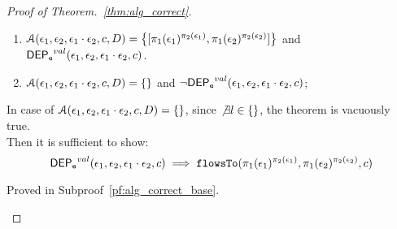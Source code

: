 \documentclass[a4paper,11pt]{article}
\begin{document}
\begin{proof}[Proof of Theorem.~\ref{thm:alg_correct}]
\begin{case}
\begin{enumerate}
  \item $\mathcal{A}(\event_1, \event_2, \event_1 \cdot \event_2, c, D) = 
  \left\{[\pi_1(\event_1)^{\pi_2(\event_1)}, \pi_1(\event_2)^{\pi_2(\event_2)}] \right \}$ 
  and $\mathsf{DEP_{\mathtt{e}}}^{val}(\mathtt{\epsilon}_1, \mathtt{\epsilon}_2, \mathtt{\epsilon}_1 \cdot \mathtt{\epsilon}_2, c)$.
  \item  $\mathcal{A}(\mathtt{\epsilon}_1, \mathtt{\epsilon}_2, \mathtt{\epsilon}_1 \cdot \mathtt{\epsilon}_2, c, D) = \{\}$ 
  and $\neg \mathsf{DEP_{\mathtt{e}}}^{val}(\mathtt{\epsilon}_1, \mathtt{\epsilon}_2, \mathtt{\epsilon}_1 \cdot \mathtt{\epsilon}_2, c)$;
\end{enumerate}
%
In case of $\mathcal{A}(\mathtt{\epsilon}_1, \mathtt{\epsilon}_2, \mathtt{\epsilon}_1 \cdot \mathtt{\epsilon}_2, c, D) = \{\}$,
since $\not\exists l \in \{\}$, the theorem is vacuously true.
%
\\
Then it is sufficient to show:
%
\[
  \mathsf{DEP_{\mathtt{e}}}^{val}(\mathtt{\epsilon}_1, \mathtt{\epsilon}_2, \mathtt{\epsilon}_1 \cdot \mathtt{\epsilon}_2, c) \implies \mathtt{flowsTo}(\pi_1(\mathtt{\epsilon}_1)^{\pi_2(\mathtt{\epsilon}_1)}, \pi_1(\mathtt{\epsilon}_2)^{\pi_2(\mathtt{\epsilon}_2)}, c)
\]
%

Proved in Subproof~\ref{pf:alg_correct_base}.


\end{case}
\end{proof}
\end{document}

